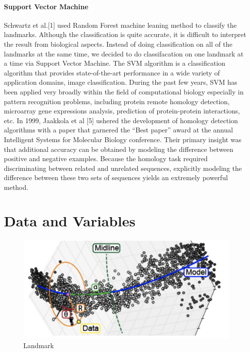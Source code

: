 \documentclass[10pt,letterpaper]{article}
\begin{document}
\paragraph{Support Vector Machine}\label{support-vector-machine}

Schwartz et al.{[}1{]} used Random Forest machine leaning method to
classify the landmarks. Although the classification is quite accurate,
it is difficult to interpret the result from biological aspects. Instead
of doing classification on all of the landmarks at the same time, we
decided to do classifacation on one landmark at a time via Support
Vector Machine. The SVM algorithm is a classification algorithm that
provides state-of-the-art performance in a wide variety of application
domains, image classification. During the past few years, SVM has been
applied very broadly within the field of computational biology
especially in pattern recognition problems, including protein remote
homology detection, microarray gene expressions analysis, prediction of
protein-protein interactions, etc. In 1999, Jaakkola et al {[}5{]}
ushered the development of homology detection algorithms with a paper
that garnered the ``Best paper'' award at the annual Intelligent Systems
for Molecular Biology conference. Their primary insight was that
additional accuracy can be obtained by modeling the difference between
positive and negative examples. Because the homology task required
discriminating between related and unrelated sequences, explicitly
modeling the difference between these two sets of sequences yields an
extremely powerful method.

\section{Data and Variables}\label{data-and-variables}

\begin{figure}[h]

{\centering \includegraphics[width=5.55in]{figures/landmark} 

}

\caption{Landmark}\label{fig:landmark}
\end{figure}
\end{document}
